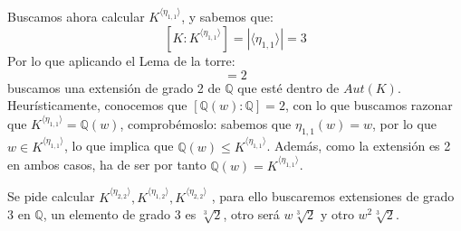 \begin{ejemplo}
    \noindent
    Buscamos ahora calcular $K^{\langle \eta_{1,1} \rangle }$, y sabemos que:
    \begin{equation*}
        \left[K:K^{\langle \eta_{1,1} \rangle }\right] = |\langle \eta_{1,1} \rangle | = 3
    \end{equation*}
    Por lo que aplicando el Lema de la torre:
    \begin{equation*}
        [K^{\eta_{1,1}}:\mathbb{Q}] = 2
    \end{equation*}
    buscamos una extensión de grado 2 de $\mathbb{Q}$ que esté dentro de $Aut(K)$. Heurísticamente, conocemos que $[\mathbb{Q}(w):\mathbb{Q}] = 2$, con lo que buscamos razonar que $K^{\langle \eta_{1,1} \rangle } = \mathbb{Q}(w)$, comprobémoslo: sabemos que $\eta_{1,1}(w) = w$, por lo que $w\in K^{\langle \eta_{1,1} \rangle }$, lo que implica que $\mathbb{Q}(w)\leq K^{\langle \eta_{1,1} \rangle }$. Además, como la extensión es 2 en ambos casos, ha de ser por tanto $\mathbb{Q}(w) = K^{\langle \eta_{1,1} \rangle }$.

    \noindent
    Se pide calcular $K^{\langle \eta_{2,2} \rangle }, K^{\langle \eta_{1,2} \rangle }, K^{\langle \eta_{2,2} \rangle }$ , para ello buscaremos extensiones de grado 3 en $\mathbb{Q}$, un elemento de grado 3 es $\sqrt[3]{2}$, otro será $w\sqrt[3]{2}$ y otro $w^2\sqrt[3]{2}$.
\end{ejemplo}

